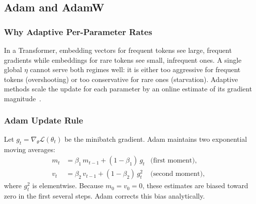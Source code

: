 \subsection{Adam and AdamW}

\subsubsection{Why Adaptive Per-Parameter Rates}

In a Transformer, embedding vectors for frequent tokens see large,
frequent gradients while embeddings for rare tokens see small, infrequent
ones. A single global $\eta$ cannot serve both regimes well: it is
either too aggressive for frequent tokens (overshooting) or too
conservative for rare ones (starvation). Adaptive methods scale the
update for each parameter by an online estimate of its gradient
magnitude~\citep{kingma2015adam}.

\subsubsection{Adam Update Rule}

Let $g_t = \nabla_\theta \mathcal{L}(\theta_t)$ be the minibatch
gradient. Adam maintains two exponential moving averages:
\begin{align}
m_t &= \beta_1\, m_{t-1} + (1-\beta_1)\, g_t
       & \text{(first moment)}, \label{eq:week2-adam-m}\\
v_t &= \beta_2\, v_{t-1} + (1-\beta_2)\, g_t^2
       & \text{(second moment)},
\end{align}
where $g_t^2$ is elementwise. Because $m_0 = v_0 = 0$, these estimates
are biased toward zero in the first several steps. Adam corrects this
bias analytically.

